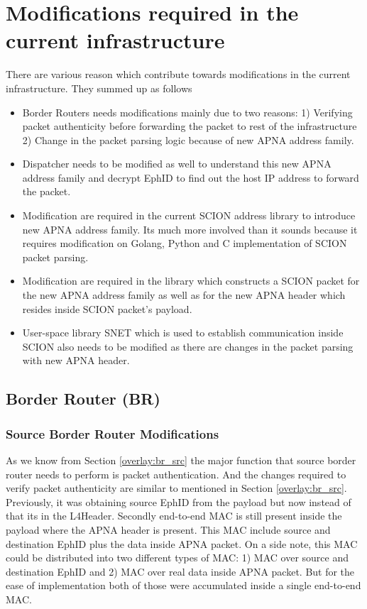 \section{Modifications required in the current infrastructure} \label{addr:tech}
There are various reason which contribute towards modifications in the current infrastructure. They summed up as follows

\begin{itemize}
    \item Border Routers needs modifications mainly due to two reasons: 1) Verifying packet authenticity before forwarding the packet to rest of the infrastructure 2) Change in the packet parsing logic because of new APNA address family.
    \item Dispatcher needs to be modified as well to understand this new APNA address family and decrypt EphID to find out the host IP address to forward the packet.
    \item Modification are required in the current SCION address library to introduce new APNA address family. Its much more involved than it sounds because it requires modification on Golang, Python and C implementation of SCION packet parsing.
    \item Modification are required in the library which constructs a SCION packet for the new APNA address family as well as for the new APNA header which resides inside SCION packet's payload.
    \item User-space library SNET which is used to establish communication inside SCION also needs to be modified as there are changes in the packet parsing with new APNA header.
\end{itemize}
\subsection{Border Router (BR)}
\subsubsection{Source Border Router Modifications}
As we know from Section \ref{overlay:br_src} the major function that source border router needs to perform is packet authentication. And the changes required to verify packet authenticity are similar to mentioned in Section \ref{overlay:br_src}. Previously, it was obtaining source EphID from the payload but now instead of that its in the L4Header. Secondly end-to-end MAC is still present inside the payload where the APNA header is present. This MAC include source and destination EphID plus the data inside APNA packet. On a side note, this MAC could be distributed into two different types of MAC: 1) MAC over source and destination EphID and 2) MAC over real data inside APNA packet. But for the ease of implementation both of those were accumulated inside a single end-to-end MAC.

